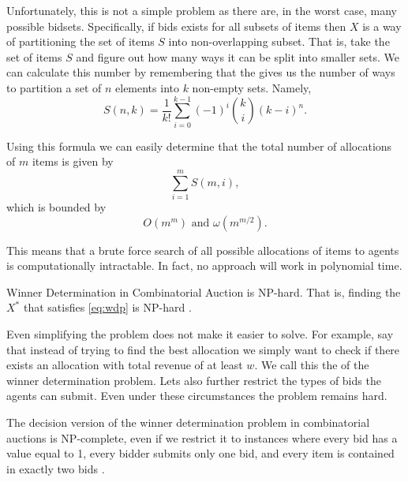 
Unfortunately, this is not a simple problem as there are, in the worst
case, many possible bidsets. Specifically, if bids exists for all
subsets of items then $X$ is a way of partitioning the set of items
$S$ into non-overlapping subset. That is, take the set of items $S$
and figure out how many ways it can be split into smaller sets. We can
calculate this number by remembering that the  gives us the number of ways to partition a set of
$n$ elements into $k$ non-empty sets. Namely,
\begin{equation}
  \label{eq:stirling}
  S(n,k) = \frac{1}{k!} \sum_{i=0}^{k-1} (-1)^i \binom{k}{i}(k-i)^n.
\end{equation}

Using this formula we can easily determine that the total number of
allocations of $m$ items is given by
\begin{equation}
  \label{eq:num-allocations}
\sum_{i=1}^{m} S(m,i),
\end{equation}
which is bounded by
\[O(m^m) \mbox{ and } \omega(m^{m/2}).\]

This means that a brute force search of all possible allocations of
items to agents is computationally intractable. In fact, no approach
will work in polynomial time.

\begin{theorem} Winner Determination in Combinatorial Auction is
  NP-hard. That is, finding the $X^*$ that satisfies \eqref{eq:wdp} is
  NP-hard \cite{rothkopf98a}.
\end{theorem}

Even simplifying the problem does not make it easier to solve. For
example, say that instead of trying to find the best allocation we
simply want to check if there exists an allocation with total revenue
of at least $w$. We call this the  of the winner
determination problem. Lets also further restrict the types of bids
the agents can submit. Even under these circumstances the problem
remains hard.

\begin{theorem}
  The decision version of the winner determination problem in
  combinatorial auctions is NP-complete, even if we restrict it to
  instances where every bid has a value equal to 1, every bidder
  submits only one bid, and every item is contained in exactly two
  bids \cite[Chapter 12]{cramton06a}.
\end{theorem}

